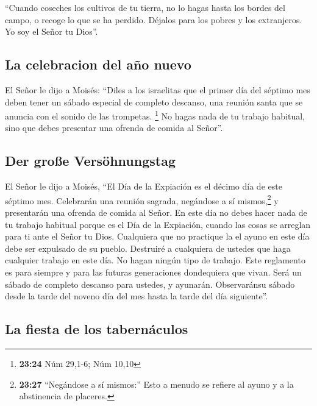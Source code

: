  ``Cuando coseches los cultivos de tu tierra, no lo hagas
hasta los bordes del campo, o recoge lo que se ha perdido. Déjalos para
los pobres y los extranjeros. Yo soy el Señor tu Dios''.

\hypertarget{la-celebracion-del-auxf1o-nuevo}{%
\subsection{La celebracion del año
nuevo}\label{la-celebracion-del-auxf1o-nuevo}}

 El Señor le dijo a Moisés:  ``Diles a los
israelitas que el primer día del séptimo mes deben tener un sábado
especial de completo descanso, una reunión santa que se anuncia con el
sonido de las trompetas. \footnote{\textbf{23:24} Núm 29,1-6; Núm 10,10}
 No hagas nada de tu trabajo habitual, sino que debes
presentar una ofrenda de comida al Señor''.

\hypertarget{der-grouxdfe-versuxf6hnungstag}{%
\subsection{Der große
Versöhnungstag}\label{der-grouxdfe-versuxf6hnungstag}}

 El Señor le dijo a Moisés,  ``El Día de
la Expiación es el décimo día de este séptimo mes. Celebrarán una
reunión sagrada, negándose a sí mismos,\footnote{\textbf{23:27}
  ``Negándose a sí mismos:'' Esto a menudo se refiere al ayuno y a la
  abstinencia de placeres.} y presentarán una ofrenda de comida al
Señor.  En este día no debes hacer nada de tu trabajo
habitual porque es el Día de la Expiación, cuando las cosas se arreglan
para ti ante el Señor tu Dios.  Cualquiera que no
practique la el ayuno en este día debe ser expulsado de su pueblo.
 Destruiré a cualquiera de ustedes que haga cualquier
trabajo en este día.  No hagan ningún tipo de trabajo.
Este reglamento es para siempre y para las futuras generaciones
dondequiera que vivan.  Será un sábado de completo
descanso para ustedes, y ayunarán. Observaránsu sábado desde la tarde
del noveno día del mes hasta la tarde del día siguiente''.

\hypertarget{la-fiesta-de-los-tabernuxe1culos}{%
\subsection{La fiesta de los
tabernáculos}\label{la-fiesta-de-los-tabernuxe1culos}}

